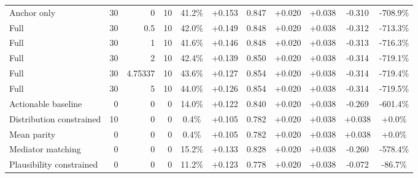 \begin{table}[htbp]
\begin{tabular}{lrrrccccccc}
Anchor only & 30 & 0 & 10 & 41.2\% & +0.153 & 0.847 & +0.020 & +0.038 & -0.310 & -708.9\% \\
Full & 30 & 0.5 & 10 & 42.0\% & +0.149 & 0.848 & +0.020 & +0.038 & -0.312 & -713.3\% \\
Full & 30 & 1 & 10 & 41.6\% & +0.146 & 0.848 & +0.020 & +0.038 & -0.313 & -716.3\% \\
Full & 30 & 2 & 10 & 42.4\% & +0.139 & 0.850 & +0.020 & +0.038 & -0.314 & -719.1\% \\
Full & 30 & 4.75337 & 10 & 43.6\% & +0.127 & 0.854 & +0.020 & +0.038 & -0.314 & -719.4\% \\
Full & 30 & 5 & 10 & 44.0\% & +0.126 & 0.854 & +0.020 & +0.038 & -0.314 & -719.5\% \\
Actionable baseline & 0 & 0 & 0 & 14.0\% & +0.122 & 0.840 & +0.020 & +0.038 & -0.269 & -601.4\% \\
Distribution constrained & 10 & 0 & 0 & 0.4\% & +0.105 & 0.782 & +0.020 & +0.038 & +0.038 & +0.0\% \\
Mean parity & 0 & 0 & 0 & 0.4\% & +0.105 & 0.782 & +0.020 & +0.038 & +0.038 & +0.0\% \\
Mediator matching & 0 & 0 & 0 & 15.2\% & +0.133 & 0.828 & +0.020 & +0.038 & -0.260 & -578.4\% \\
Plausibility constrained & 0 & 0 & 0 & 11.2\% & +0.123 & 0.778 & +0.020 & +0.038 & -0.072 & -86.7\% \\
\bottomrule
\end{tabular}
\end{table}